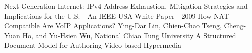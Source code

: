 \documentclass[11pt,twocolumn]{article}
\begin{document}
\begin{thebibliography}{9}


 Next Generation Internet: IPv4 Address Exhaustion, Mitigation Strategies and Implications for the U.S. - An IEEE-USA White Paper - 2009
 How NAT-Compatible Are VoIP Applications? Ying-Dar Lin, Chien-Chao Tseng, Cheng-Yuan Ho, and Yu-Hsien Wu, National Chiao Tung University
 A Structured Document Model for Authoring Video-based Hypermedia

\end{thebibliography}
\end{document}
